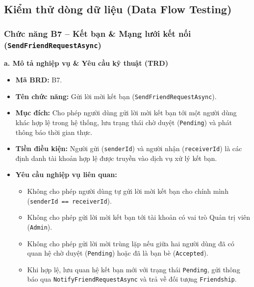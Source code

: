 \documentclass[11pt,a4paper]{article}
\begin{document}
\endgroup


\subsection{Kiểm thử dòng dữ liệu (Data Flow Testing)}

\subsubsection{Chức năng B7 -- Kết bạn \& Mạng lưới kết nối (\texttt{SendFriendRequestAsync})}

\noindent\textbf{a. Mô tả nghiệp vụ \& Yêu cầu kỹ thuật (TRD)}
\begin{itemize}[leftmargin=1.2cm, noitemsep]
    \item[\textbf{--}] \textbf{Mã BRD:} B7.
    \item[\textbf{--}] \textbf{Tên chức năng:} Gửi lời mời kết bạn (\texttt{SendFriendRequestAsync}).
    \item[\textbf{--}] \textbf{Mục đích:} Cho phép người dùng gửi lời mời kết bạn tới một người dùng khác hợp lệ trong hệ thống, lưu trạng thái chờ duyệt (\texttt{Pending}) và phát thông báo thời gian thực.
    \item[\textbf{--}] \textbf{Tiền điều kiện:} Người gửi (\texttt{senderId}) và người nhận (\texttt{receiverId}) là các định danh tài khoản hợp lệ được truyền vào dịch vụ xử lý kết bạn.
    \item[\textbf{--}] \textbf{Yêu cầu nghiệp vụ liên quan:}
    \begin{itemize}[leftmargin=0.8cm, label=$\bullet$, noitemsep]
        \item Không cho phép người dùng tự gửi lời mời kết bạn cho chính mình (\texttt{senderId == receiverId}).
        \item Không cho phép gửi lời mời kết bạn tới tài khoản có vai trò Quản trị viên (\texttt{Admin}).
        \item Không cho phép gửi lời mời trùng lặp nếu giữa hai người dùng đã có quan hệ chờ duyệt (\texttt{Pending}) hoặc đã là bạn bè (\texttt{Accepted}).
        \item Khi hợp lệ, lưu quan hệ kết bạn mới với trạng thái \texttt{Pending}, gửi thông báo qua \texttt{NotifyFriendRequestAsync} và trả về đối tượng \texttt{Friendship}.
    \end{itemize}
\end{itemize}
\end{document}
